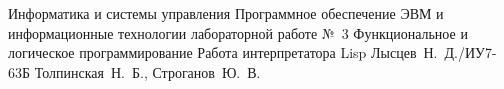 \documentclass{bmstu}
\begin{document}
\makereporttitle
{Информатика и системы управления} %
{Программное обеспечение ЭВМ и информационные технологии}
{лабораторной работе №~3} %
{Функциональное и логическое программирование} %
{Работа интерпретатора Lisp} %
{} %
{Лысцев~Н.~Д./ИУ7-63Б} %
{Толпинская~Н.~Б.,  Строганов~Ю.~В.} %
{}


%

%
%
%

\end{document}
